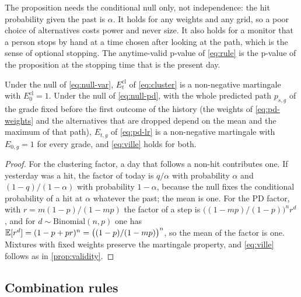 The proposition needs the conditional null only, not independence: the hit probability given the past is $\alpha$. It holds for any weights and any grid, so a poor choice of alternatives costs power and never size.
It also holds for a monitor that a person stops by hand at a time chosen after looking at the path, which is the sense of optional stopping. The anytime-valid p-value of \cref{eq:rule} is the p-value of the proposition at the stopping time that is the present day.

\begin{proposition}
\label{prop:clustering}
Under the null of \cref{eq:null-var}, $E^{\mathrm{cl}}_t$ of \cref{eq:cluster} is a non-negative martingale with $E_0^{\mathrm{cl}}=1$. Under the null of \cref{eq:null-pd}, with the whole predicted path $p_{s,g}$ of the grade fixed before the first outcome of the history (the weights of \cref{eq:pd-weights} and the alternatives that are dropped depend on the mean and the maximum of that path), $E_{t,g}$ of \cref{eq:pd-lr} is a non-negative martingale with $E_{0,g}=1$ for every grade, and \cref{eq:ville} holds for both.
\end{proposition}
\begin{proof}
For the clustering factor, a day that follows a non-hit contributes one. If yesterday was a hit, the factor of today is $q/\alpha$ with probability $\alpha$ and $(1-q)/(1-\alpha)$ with probability $1-\alpha$, because the null fixes the conditional probability of a hit at $\alpha$ whatever the past; the mean is one. For the PD factor, with $r=m(1-p)/(1-mp)$ the factor of a step is $\bigl((1-mp)/(1-p)\bigr)^{n}r^{d}$, and for $d\sim\mathrm{Binomial}(n,p)$ one has $\mathbb{E}[r^d]=(1-p+pr)^n=\bigl((1-p)/(1-mp)\bigr)^n$, so the mean of the factor is one. Mixtures with fixed weights preserve the martingale property, and \cref{eq:ville} follows as in \cref{prop:validity}.
\end{proof}

\subsection{Combination rules}
\label{sec:theory-combination}

